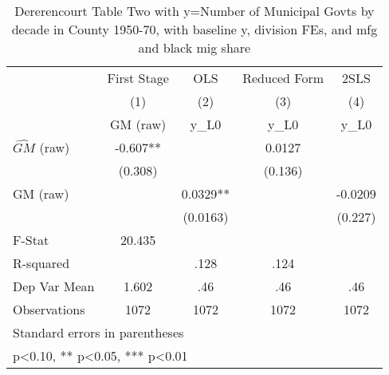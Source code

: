 \begin{table}[htbp]\centering
\def\sym#1{\ifmmode^{#1}\else\(^{#1}\)\fi}
\caption{Dererencourt Table Two with y=Number of Municipal Govts by decade in County 1950-70, with baseline y, division FEs, and mfg and black mig share}
\begin{tabular}{l*{4}{c}}
\toprule
                    & First Stage   &         OLS   &Reduced Form   &        2SLS   \\
                    &\multicolumn{1}{c}{(1)}&\multicolumn{1}{c}{(2)}&\multicolumn{1}{c}{(3)}&\multicolumn{1}{c}{(4)}\\
                    &\multicolumn{1}{c}{GM  (raw)}&\multicolumn{1}{c}{y\_L0}&\multicolumn{1}{c}{y\_L0}&\multicolumn{1}{c}{y\_L0}\\
\midrule
$\hat{GM}$ (raw)    &      -0.607** &               &      0.0127   &               \\
                    &     (0.308)   &               &     (0.136)   &               \\
\addlinespace
GM  (raw)           &               &      0.0329** &               &     -0.0209   \\
                    &               &    (0.0163)   &               &     (0.227)   \\
\midrule
F-Stat              &      20.435   &               &               &               \\
R-squared           &               &        .128   &        .124   &               \\
Dep Var Mean        &       1.602   &         .46   &         .46   &         .46   \\
Observations        &        1072   &        1072   &        1072   &        1072   \\
\bottomrule
\multicolumn{5}{l}{\footnotesize Standard errors in parentheses}\\
\multicolumn{5}{l}{\footnotesize * p<0.10, ** p<0.05, *** p<0.01}\\
\end{tabular}
\end{table}
